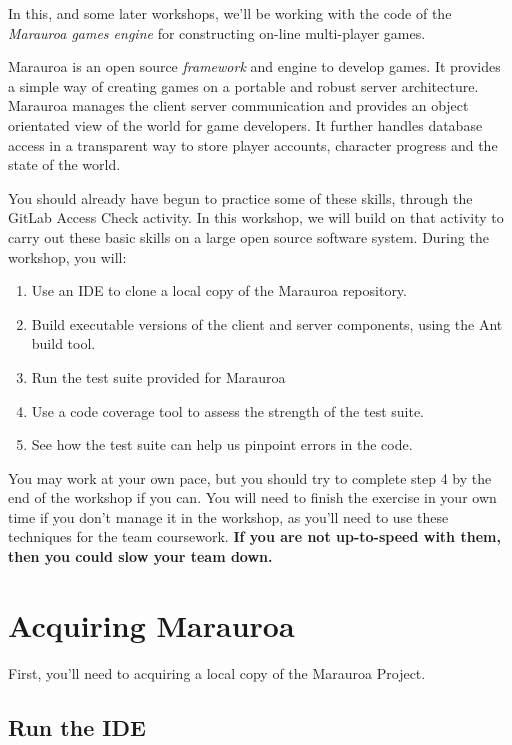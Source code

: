 \documentclass[
]{book}
\providecommand{\tightlist}{%
  \setlength{\itemsep}{0pt}\setlength{\parskip}{0pt}}
\begin{document}
In this, and some later workshops, we'll be working with the code of the \emph{Marauroa games engine} for constructing on-line multi-player games.

Marauroa is an open source \emph{framework} and engine to develop games. It provides a simple way of creating games on a portable and robust server architecture. Marauroa manages the client server communication and provides an object orientated view of the world for game developers. It further handles database access in a transparent way to store player accounts, character progress and the state of the world.

You should already have begun to practice some of these skills, through the GitLab Access Check activity.
In this workshop, we will build on that activity to carry out these basic skills on a large open source software system. During the workshop, you will:

\begin{enumerate}
\def\labelenumi{\arabic{enumi}.}
\tightlist
\item
  Use an IDE to clone a local copy of the Marauroa repository.
\item
  Build executable versions of the client and server components, using the Ant build tool.
\item
  Run the test suite provided for Marauroa
\item
  Use a code coverage tool to assess the strength of the test suite.
\item
  See how the test suite can help us pinpoint errors in the code.
\end{enumerate}

You may work at your own pace, but you should try to complete step 4 by the end of the workshop if you can. You will need to finish the exercise in your own time if you don't manage it in the workshop, as you'll need to use these techniques for the team coursework. \textbf{If you are not up-to-speed with them, then you could slow your team down.}

\hypertarget{acquiring}{%
\section{Acquiring Marauroa}\label{acquiring}}

First, you'll need to acquiring a local copy of the Marauroa Project.

\hypertarget{runide}{%
\subsection{Run the IDE}\label{runide}}
\end{document}
